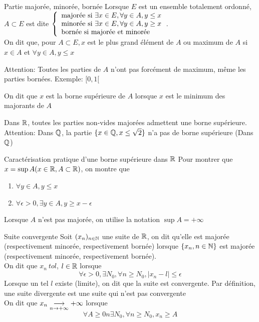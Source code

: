 \documentclass[]{report}
\begin{document}
\begin{nt}{Partie majorée, minorée, bornée}{}
    Lorsque $E$ est un ensemble totalement ordonné, $A\subset E$ est dite $\left\{\begin{array}{ll}  \text{majorée si $\exists x\in E, \forall y \in A, y\le x$}\\ \text{minorée si $\exists x\in E, \forall y\in A, y\ge x$}\\ \text{bornée si majorée et minorée} \end{array} \right.$.\\
    On dit que, pour $A\subset E, x$ est le plus grand élément de $A$ ou maximum de $A$ si $x\in A$ et $\forall y\in A, y\le x$
\end{nt}

Attention: Toutes les parties de $A$ n'ont pas forcément de maximum, même les parties bornées. Exemple: $[0,1[$

\begin{nt}{}{}
    On dit que $x$ est la borne supérieure de $A$ lorsque $x$ est le minimum des majorants de $A$
\end{nt}

\begin{prop}{}{}
    Dans $\mathbb{R}$, toutes les parties non-vides majorées admettent une borne supérieure.\\
    Attention: Dans $\mathbb{Q}$, la partie $\{x\in \mathbb{Q},x\le \sqrt{2}\}$ n'a pas de borne supérieure (Dans $\mathbb{Q}$)
\end{prop}

\begin{prop}{Caractérisation pratique d'une borne supérieure dans $\mathbb{R}$}{}
    Pour montrer que $x= \sup A (x\in \mathbb{R}, A\subset \mathbb{R})$, on montre que
\begin{enumerate}
    \item $\forall y\in A, y\le x$
    \item $\forall \epsilon> 0, \exists y\in A, y\ge x-\epsilon$
\end{enumerate}
\end{prop}

\begin{nt}{}{}
    Lorsque $A$ n'est pas majorée, on utilise la notation $\sup A= +\infty$
\end{nt}

\begin{df}{Suite convergente}{}
    Soit $(x_n)_{n\in\mathbb{N}}$ une suite de $\mathbb{R}$, on dit qu'elle est majorée (respectivement minorée, respectivement bornée) lorsque $\{x_n,{n\in\mathbb{N}}\}$ est majorée (respectivement minorée, respectivement bornée).\\
    On dit que $x_n\ to l$, $l\in \mathbb{R}$ lorsque 
    \[\forall \epsilon >0,\exists N_0,\forall n\ge N_0,\left|x_n-l\right|\le \epsilon\]
    Lorsque un tel $l$ existe (limite), on dit que la suite est convergente. Par définition, une suite divergente est une suite qui n'est pas convergente\\
    On dit que $x_n\underset{n\to +\infty}{\longrightarrow} +\infty$ lorsque
    \[\forall A\ge 0n \exists N_0, \forall n\ge N_0, x_n \ge A\]
\end{df}
\end{document}
